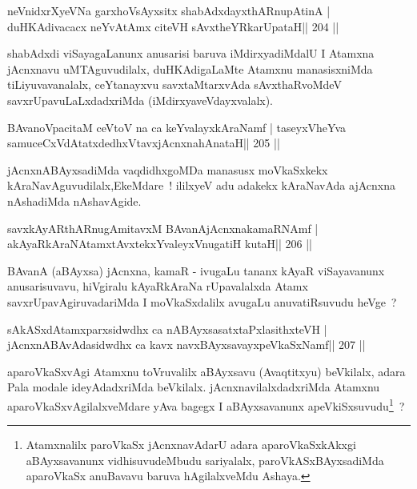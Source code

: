 
\begin{shl}
neVnidxrXyeVNa garxhoV\s sAyxsitx shabAdxdayxthARnupAtinA |
duHKAdivacacx neYvA\s\s tAmx citeVH sAvxtheYRkarUpataH\hfill || 204 ||
\end{shl}

\begin{artha}
shabAdxdi viSayagaLanunx anusarisi baruva iMdirxyadiMdalU I Atamxna jAcnxnavu uMTAguvudilalx, duHKAdigaLaMte Atamxnu manasisxniMda tiLiyuvavanalalx, ceYtanayxvu savxtaMtarxvAda sAvxthaRvoMdeV savxrUpavuLaLxdadxriMda (iMdirxyaveVdayxvalalx).
\end{artha}


\begin{shl}
BAvanoVpacitaM ceVtoV na ca keYvalayxkAraNamf |
taseyxVheYva samuceCxVdAtatxdedhxVtavxjAcnxnahAnataH\hfill || 205 ||
\end{shl}

\begin{artha}
jAcnxnABAyxsadiMda vaqdidhxgoMDa manasusx moVkaSxkekx kAraNavAguvudilalx,\break EkeMdare~! ililxyeV adu adakekx kAraNavAda ajAcnxna nAshadiMda nAshavAgide.
\end{artha}

\begin{shl}
savxkAyARthARnugAmitavxM BAvanAjAcnxnakamaRNAmf |
akAyaRkAraNAtamxtAvxtekxYvaleyxV\s nugatiH kutaH\hfill || 206 ||
\end{shl}

\begin{artha}
BAvanA (aBAyxsa) jAcnxna, kamaR - ivugaLu tananx kAyaR viSayavanunx anusarisuvavu, hiVgiralu kAyaRkAraNa rUpavalalxda Atamx savxrUpavAgiruvadariMda I moVkaSxdalilx avugaLu anuvatiRsuvudu heVge~?
\end{artha}

\begin{shl}
sAkASxdAtamxparxsidwdhx ca nABAyxsasatxtaPxlasithxteVH |
jAcnxnABAvAdasidwdhx ca kavx navxBAyxsavayxpeVkaSxNamf\hfill || 207 ||
\end{shl}

\begin{artha}
aparoVkaSxvAgi Atamxnu toVruvalilx aBAyxsavu (Avaqtitxyu) beVkilalx, adara Pala modale ideyAdadxriMda beVkilalx. jAcnxnavilalxdadxriMda Atamxnu aparoVkaSxvAgilalxveMdare yAva bagegx I aBAyxsavanunx apeVkiSxsuvudu\footnote{Atamxnalilx paroVkaSx jAcnxnavAdarU adara aparoVkaSxkAkxgi aBAyxsavanunx vidhisuvudeMbudu sariyalalx, paroVkASxBAyxsadiMda aparoVkaSx anuBavavu baruva hAgilalxveMdu Ashaya.}~?
\end{artha}

